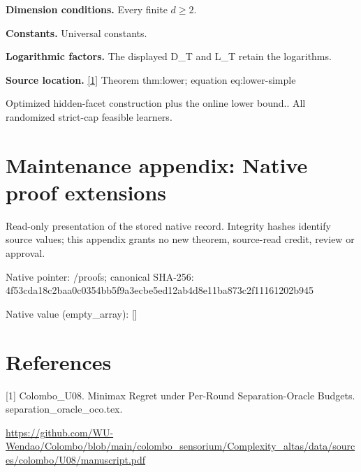 \documentclass[10pt,a4paper]{article}
\begin{document}
\textbf{Dimension conditions.} Every finite $d\ge 2$.



\textbf{Constants.} Universal constants.



\textbf{Logarithmic factors.} The displayed D\_T and L\_T retain the logarithms.



\textbf{Source location.} \href{https://github.com/WU-Wendao/Colombo/blob/main/colombo_sensorium/Complexity_altas/data/sources/colombo/U08/manuscript.pdf}{[1]} Theorem thm:lower; equation eq:lower-simple



Optimized hidden-facet construction plus the online lower bound.. All randomized strict-cap feasible learners.



\section{Maintenance appendix: Native proof extensions}


Read-only presentation of the stored native record. Integrity hashes identify source values; this appendix grants no new theorem, source-read credit, review or approval.



Native pointer: /proofs; canonical SHA-256: 4f53cda18c2baa0c0354bb5f\allowbreak{}9a3ecbe5ed12ab4d8e11ba87\allowbreak{}3c2f11161202b945



Native value (empty\_array): []



\section{References}


[1] Colombo\_U08. Minimax Regret under Per-Round Separation-Oracle Budgets. separation\_oracle\_oco.tex.



\url{https://github.com/WU-Wendao/Colombo/blob/main/colombo_sensorium/Complexity_altas/data/sources/colombo/U08/manuscript.pdf}
\end{document}

